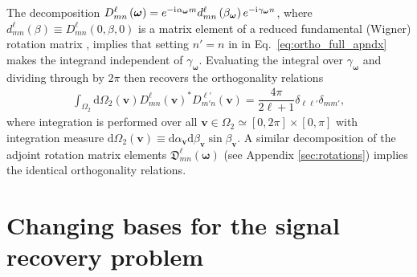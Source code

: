 \documentclass[notitlepage,twocolumn]{revtex4-2}
\newcommand{\f}[2]{\dfrac{#1}{#2}} %
\newcommand{\p}[1]{\left(#1\right)} %
\renewcommand{\v}{\bm} %
\renewcommand{\i}{\mathrm{i}\mkern1mu} %
\newcommand{\1}{\mathds{1}}
\newcommand{\D}{\mathfrak{D}}
\renewcommand{\d}{\text{d}}
\begin{document}
The decomposition $D^\ell_{mn}\p{\v\omega} = e^{-\i\alpha_{\v\omega}m} d^\ell_{mn}\p{\beta_{\v\omega}} e^{-\i\gamma_{\v\omega}n}$, where $d^\ell_{mn}\p{\beta}\equiv D^\ell_{mn}\p{0,\beta,0}$ is
a matrix element of a reduced fundamental (Wigner) rotation matrix \cite{rose1957elementary}, implies that setting $n'=n$ in in Eq.~\eqref{eq:ortho_full_apndx} makes the integrand independent of $\gamma_{\v\omega}$.
Evaluating the integral over $\gamma_{\v\omega}$ and dividing through by $2\pi$ then recovers the orthogonality relations
\begin{align}
  \int_{\Omega_2} \d\Omega_2\p{\v v}
  D^{\ell}_{mn}\p{\v v}^* D^{\ell'}_{m'n}\p{\v v}
  = \f{4\pi}{2\ell+1} \delta_{\ell\ell'} \delta_{mm'},
  \label{eq:ortho_sphere_apndx}
\end{align}
where integration is performed over all $\v v\in\Omega_2\simeq[0,2\pi]\times[0,\pi]$ with integration measure $\d\Omega_2\p{\v v} \equiv \d\alpha_{\v v} \d\beta_{\v v} \sin\beta_{\v v}$.
A similar decomposition of the adjoint rotation matrix elements $\D^\ell_{mn}\p{\v\omega}$ (see Appendix \ref{sec:rotations}) implies the identical orthogonality relations.

\section{Changing bases for the signal recovery problem}
\label{sec:basis_change}
\end{document}
